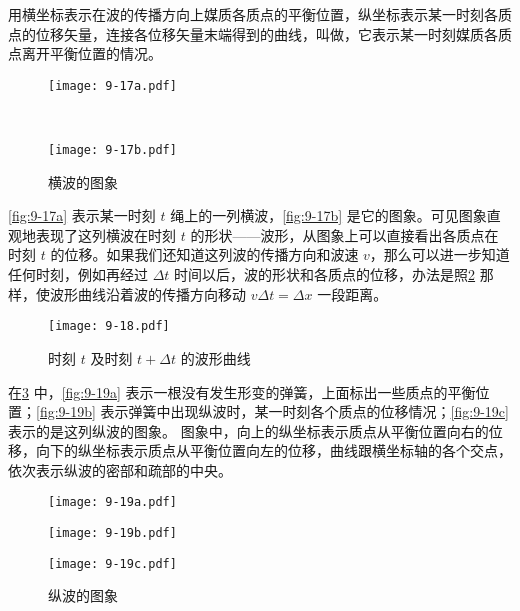 用横坐标表示在波的传播方向上媒质各质点的平衡位置，纵坐标表示某一时刻各质点的位移矢量，连接各位移矢量末端得到的曲线，叫做，它表示某一时刻媒质各质点离开平衡位置的情况。
\begin{figure}
  \begin{minipage}{0.1\linewidth}
    \subcaption{}\label{fig:9-17a}
  \end{minipage}%
  \begin{minipage}{0.85\linewidth}
    \texttt{[image: 9-17a.pdf]}
  \end{minipage}\\[-3mm]
  \begin{minipage}{0.1\linewidth}
    \subcaption{}\label{fig:9-17b}
  \end{minipage}%
  \begin{minipage}{0.85\linewidth}
    \texttt{[image: 9-17b.pdf]}
  \end{minipage}
  \caption{横波的图象}\label{fig:9-17}
\end{figure}

\cref{fig:9-17a} 表示某一时刻 $t$ 绳上的一列横波，\cref{fig:9-17b} 是它的图象。可见图象直观地表现了这列横波在时刻 $t$ 的形状——波形，从图象上可以直接看出各质点在时刻 $t$ 的位移。如果我们还知道这列波的传播方向和波速 $v$，那么可以进一步知道任何时刻，例如再经过 $\Delta t$ 时间以后，波的形状和各质点的位移，办法是照\cref{fig:9-18} 那样，使波形曲线沿着波的传播方向移动 $v\Delta t=\Delta x$ 一段距离。
\begin{figure}
  \texttt{[image: 9-18.pdf]}
  \caption{时刻 $t$ 及时刻 $t+\Delta t$ 的波形曲线}\label{fig:9-18}
\end{figure}

在\cref{fig:9-19} 中，\cref{fig:9-19a} 表示一根没有发生形变的弹簧，上面标出一些质点的平衡位置；\cref{fig:9-19b} 表示弹簧中出现纵波时，某一时刻各个质点的位移情况；\cref{fig:9-19c} 表示的是这列纵波的图象。
图象中，向上的纵坐标表示质点从平衡位置向右的位移，向下的纵坐标表示质点从平衡位置向左的位移，曲线跟横坐标轴的各个交点，依次表示纵波的密部和疏部的中央。
\begin{figure}
  \begin{minipage}{0.1\linewidth}
    \subcaption{}\label{fig:9-19a}
  \end{minipage}%
  \begin{minipage}{0.85\linewidth}
    \texttt{[image: 9-19a.pdf]}
  \end{minipage}
  \begin{minipage}{0.1\linewidth}
    \subcaption{}\label{fig:9-19b}
  \end{minipage}%
  \begin{minipage}{0.85\linewidth}
    \texttt{[image: 9-19b.pdf]}
  \end{minipage}
  \begin{minipage}{0.1\linewidth}
    \subcaption{}\label{fig:9-19c}
  \end{minipage}%
  \begin{minipage}{0.85\linewidth}
    \texttt{[image: 9-19c.pdf]}
  \end{minipage}
  \caption{纵波的图象}\label{fig:9-19}
\end{figure}

